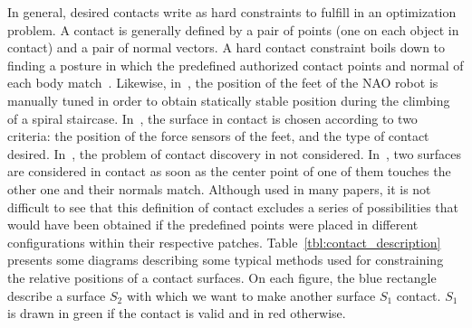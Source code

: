 In general, desired contacts write as hard constraints to fulfill in an optimization problem.
A contact is generally defined by a pair of points (one on each object in contact) and a pair of normal vectors.
A hard contact constraint boils down to finding a posture in which the predefined authorized contact points and normal of each body match~\cite{zhang:TePRA:2013}\cite{hauser:IJRR:2008}.
Likewise, in~\cite{osswald:iros:2011}, the position of the feet of the NAO robot is manually tuned in order to obtain statically stable position during the climbing of a spiral staircase.
In~\cite{Chestnutt:2009:BNR:1733023.1733314}, the surface in contact is chosen according to two criteria: the position of the force sensors of the feet, and the type of contact desired.
In~\cite{sentis:itro:2010}, the problem of contact discovery in not considered.
In~\cite{mordatch:acm:2012}, two surfaces are considered in contact as soon as the center point of one of them touches the other one and their normals match.
Although used in many papers, it is not difficult to see that this definition of contact excludes a series of possibilities that would have been obtained if the predefined points were placed in different configurations within their respective patches.
Table~\ref{tbl:contact_description} presents some diagrams describing some typical methods used for constraining the relative positions of a contact surfaces.
On each figure, the blue rectangle describe a surface $S_2$ with which we want to make another surface $S_1$ contact. $S_1$ is drawn in green if the contact is valid and in red otherwise.


